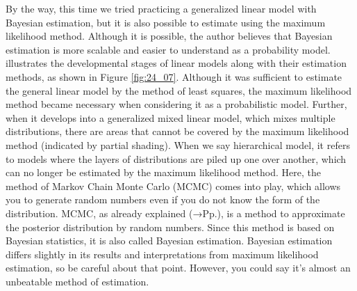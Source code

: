 \documentclass{ltjsbook}
\begin{document}
By the way, this time we tried practicing a generalized linear model with Bayesian estimation, but it is also possible to estimate using the maximum likelihood method. Although it is possible, the author believes that Bayesian estimation is more scalable and easier to understand as a probability model.
\textcite{Kubo2012} illustrates the developmental stages of linear models along with their estimation methods, as shown in Figure \ref{fig:24_07}. Although it was sufficient to estimate the general linear model by the method of least squares, the maximum likelihood method became necessary when considering it as a probabilistic model. Further, when it develops into a generalized mixed linear model, which mixes multiple distributions, there are areas that cannot be covered by the maximum likelihood method (indicated by partial shading). When we say hierarchical model, it refers to models where the layers of distributions are piled up one over another, which can no longer be estimated by the maximum likelihood method. Here, the method of Markov Chain Monte Carlo (MCMC) comes into play, which allows you to generate random numbers even if you do not know the form of the distribution. MCMC, as already explained (→Pp.\pageref{MCMC}), is a method to approximate the posterior distribution by random numbers. Since this method is based on Bayesian statistics, it is also called Bayesian estimation. Bayesian estimation differs slightly in its results and interpretations from maximum likelihood estimation, so be careful about that point. However, you could say it's almost an unbeatable method of estimation.
\end{document}
